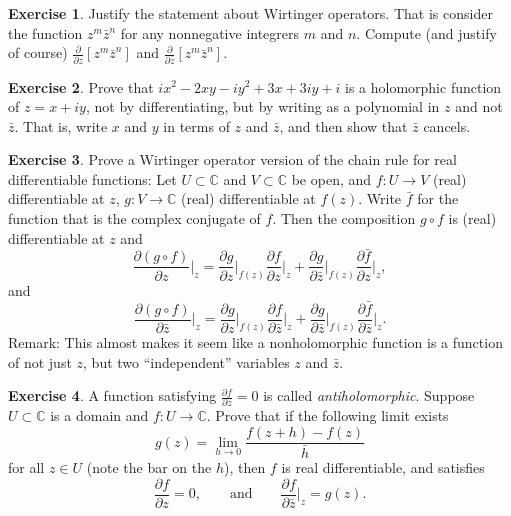 \documentclass[12pt,openany]{book}
\newcommand{\C}{{\mathbb{C}}}
\newcommand{\myindex}[1]{#1\index{#1}}
\theoremstyle{plain}
\theoremstyle{remark}
\theoremstyle{definition}
\newenvironment{exbox}{%
    \def\FrameCommand{\vrule width 1pt \relax\hspace {10pt}}%
    \MakeFramed {\advance \hsize -\width \FrameRestore }%
}{%
    \endMakeFramed
}
\theoremstyle{exercise}
\newtheorem{exercise}{Exercise}[section]
\theoremstyle{example}
\begin{document}
\begin{exbox}
\begin{exercise}
Justify the statement about Wirtinger operators.  That is consider
the function $z^m\bar{z}^n$ for any nonnegative integrers $m$ and $n$.
Compute (and justify of course)
$\frac{\partial}{\partial z} \left[ z^m\bar{z}^n \right]$
and
$\frac{\partial}{\partial \bar{z}} \left[ z^m\bar{z}^n \right]$.
\end{exercise}

\begin{exercise}
Prove that $ix^2 - 2xy -iy^2 + 3x + 3iy + i$ is a holomorphic function of
$z = x+iy$, not by
differentiating, but by writing as a polynomial in $z$ and not $\bar{z}$.
That is, write $x$ and $y$ in terms of $z$ and $\bar{z}$, and then show
that $\bar{z}$ cancels.
\end{exercise}

\begin{exercise}
Prove a Wirtinger operator version of the chain rule for real differentiable
functions:  Let $U \subset \C$ and $V \subset \C$ be open, and $f \colon U \to V$
(real) differentiable at $z$, $g \colon V \to \C$ (real) differentiable
at $f(z)$.  Write $\bar{f}$ for the function that is the complex conjugate
of $f$.  Then the composition $g \circ f$
is (real) differentiable at $z$ and
\begin{equation*}
\frac{\partial (g \circ f)}{\partial z}\Big|_z
=
\frac{\partial g}{\partial z}\Big|_{f(z)}
\frac{\partial f}{\partial z}\Big|_z
+
\frac{\partial g}{\partial \bar{z}}\Big|_{f(z)}
\frac{\partial \bar{f}}{\partial z}\Big|_z ,
\end{equation*}
and
\begin{equation*}
\frac{\partial (g \circ f)}{\partial \bar{z}}\Big|_z
=
\frac{\partial g}{\partial z}\Big|_{f(z)}
\frac{\partial f}{\partial \bar{z}}\Big|_z
+
\frac{\partial g}{\partial \bar{z}}\Big|_{f(z)}
\frac{\partial \bar{f}}{\partial \bar{z}}\Big|_z .
\end{equation*}
Remark: This almost makes it seem like a nonholomorphic function is a
function of not just $z$, but two ``independent'' variables $z$ and
$\bar{z}$.
\end{exercise}

\begin{exercise}
A function satisfying $\frac{\partial f}{\partial z} = 0$ is called
\emph{\myindex{antiholomorphic}}.
Suppose $U \subset \C$ is a domain and $f \colon U \to \C$.
Prove that if the following
limit exists
\begin{equation*}
g(z) = 
\lim_{h \to 0}
\frac{f(z+h)-f(z)}{\bar{h}}
\end{equation*}
for all $z \in U$ (note the bar on the $h$), then $f$ is real differentiable, and satisfies
\begin{equation*}
\frac{\partial f}{\partial z} = 0, \qquad \text{and} \qquad
\frac{\partial f}{\partial \bar{z}}\Big|_{z} = g(z).
\end{equation*}
\end{exercise}
\end{exbox}
\end{document}
